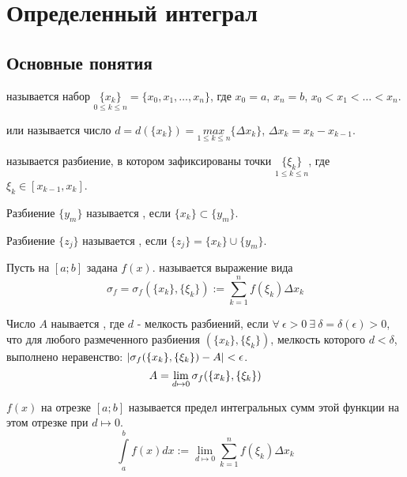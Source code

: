 \chapter{Определенный интеграл}
\section{Основные понятия}
\begin{opred}
 называется набор $\underset{0\leq k\leq n}{\{x_k\}}=\{x_0,x_1,\ldots,x_n\}$, где $x_0=a$, $x_n=b$, $x_0<x_1<\ldots<x_n$.
\end{opred}
\begin{opred}
 или  называется число $d=d(\{x_k\})=\underset{1\leq k\leq n}{max}\{\Delta x_k\}$, $\Delta x_k=x_k-x_{k-1}$.
\end{opred}
\begin{opred}
 называется разбиение, в котором зафиксированы точки $\underset{1\leq k\leq n}{\{\xi_k\}}$, где $\xi_k\in[x_{k-1},x_k]$.
\end{opred}
\begin{opred}
Разбиение $\{y_m\}$ называется , если $\{x_k\}\subset\{y_m\}$.
\end{opred}
\begin{opred}
Разбиение $\{z_j\}$ называется , если $\{z_j\}=\{x_k\}\cup\{y_m\}$.
\end{opred}
\begin{opred}
Пусть на $[a;b]$ задана $f(x)$.  называется выражение вида $$\sigma_f=\sigma_f(\{x_k\},\{\xi_k\}):=\sum\limits^n_{k=1}f(\xi_k)\Delta x_k$$
\end{opred}
\begin{opred}
Число $A$ наывается , где $d$ - мелкость разбиений, если $\forall\ \epsilon>0\ \exists\ \delta=\delta(\epsilon)>0$, что для любого размеченного разбиения $(\{x_k\},\{\xi_k\})$, мелкость которого $d<\delta$, выполнено неравенство: $|\sigma_f(\{x_k\},\{\xi_k\})-A|<\epsilon$.
$$A=\lim\limits_{d\mapsto0}\sigma_f(\{x_k\},\{\xi_k\})$$
\end{opred}
\begin{opred}
 $f(x)$ на отрезке $[a;b]$ называется предел интегральных сумм этой функции на этом отрезке при $d\mapsto0$.
$$\int\limits^b_af(x)dx:=\lim\limits_{d\mapsto0}\sum\limits^n_{k=1}f(\xi_k)\Delta x_k$$
\end{opred}
